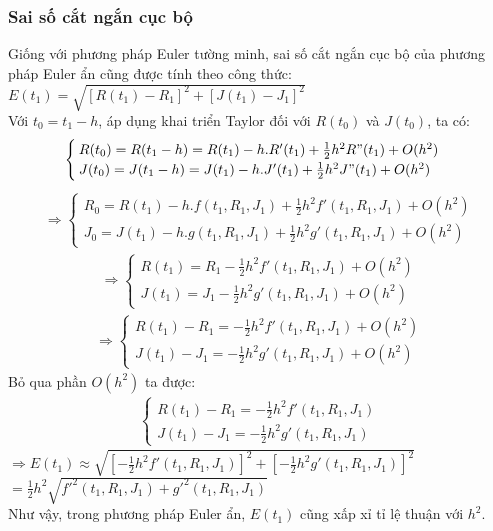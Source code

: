 \subsubsection{Sai số cắt ngắn cục bộ}
\hspace*{0.5cm} {Giống với phương pháp Euler tường minh, sai số cắt ngắn cục bộ của phương pháp Euler ẩn cũng được tính theo công thức:}\\
\hspace*{4cm} {$E(t_1) = \sqrt{[R(t_1) - R_1]^2 + [J(t_1) - J_1]^2}$}\\
\hspace*{0.5cm} {Với $t_0 = t_1 - h$, áp dụng khai triển Taylor đối với $R(t_0)$ và $J(t_0)$, ta có:}
\begin{align}
    \begin{cases}
        R(t_0) = R(t_1 - h) = R(t_1) - h.R'(t_1) + \frac{1}{2}h^2R"(t_1) + O(h^2)\\
        J(t_0) = J(t_1 - h) = J(t_1) - h.J'(t_1) + \frac{1}{2}h^2J"(t_1) + O(h^2)
    \end{cases}
\end{align}
\begin{align}
    \Rightarrow
    \begin{cases}
        R_0 = R(t_1) - h.f(t_1, R_1, J_1) + \frac{1}{2}h^2f'(t_1, R_1, J_1) + O(h^2)\\
        J_0 = J(t_1) - h.g(t_1, R_1, J_1) + \frac{1}{2}h^2g'(t_1, R_1, J_1) + O(h^2)
    \end{cases}
\end{align}
\begin{align}
    \Rightarrow
    \begin{cases}
        R(t_1) = R_1 - \frac{1}{2}h^2f'(t_1, R_1, J_1) + O(h^2)\\
        J(t_1) = J_1 - \frac{1}{2}h^2g'(t_1, R_1, J_1) + O(h^2)
    \end{cases}
\end{align}
\begin{align}
    \Rightarrow
    \begin{cases}
        R(t_1) - R_1 = -\frac{1}{2}h^2f'(t_1, R_1, J_1) + O(h^2)\\
        J(t_1) - J_1 = -\frac{1}{2}h^2g'(t_1, R_1, J_1) + O(h^2)
    \end{cases}
\end{align}
\hspace*{0.5cm} {Bỏ qua phần $O(h^2)$ ta được:}
\begin{align}
    \begin{cases}
        R(t_1) - R_1 = -\frac{1}{2}h^2f'(t_1, R_1, J_1)\\
        J(t_1) - J_1 = -\frac{1}{2}h^2g'(t_1, R_1, J_1)
    \end{cases}
\end{align}
\hspace*{3cm} {$\Rightarrow E(t_1) \approx \sqrt{[-\frac{1}{2}h^2f'(t_1, R_1, J_1)]^2 + [-\frac{1}{2}h^2g'(t_1, R_1, J_1)]^2}$}\\
\hspace*{4cm} {$= \frac{1}{2}h^2\sqrt{f'^2(t_1,R_1,J_1) + g'^2(t_1,R_1,J_1)}$}\\
\hspace*{0.5cm} {Như vậy, trong phương pháp Euler ẩn, $E(t_1)$ cũng xấp xỉ tỉ lệ thuận với $h^2$.}
